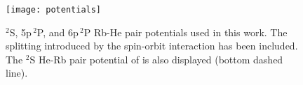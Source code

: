 	\begin{figure}
		\begin{center}
			\texttt{[image: potentials]}
		\end{center}
		\caption{$^2$S, 5p$\,^2$P, and 6p$\,^2$P Rb-He pair potentials used in this work. The splitting introduced by the spin-orbit interaction has been included. The $^2$S He-Rb pair potential of is also displayed (bottom dashed line).}
		\label{fig:potentials}
	\end{figure}

	\cleardoublepage
	
%	
	
\clearpage{\pagestyle{empty}\cleardoublepage}